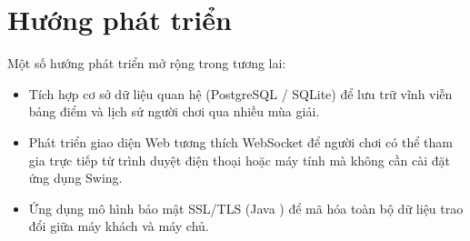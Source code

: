 \section{Hướng phát triển}

Một số hướng phát triển mở rộng trong tương lai:
\begin{itemize}[leftmargin=1.6em, itemsep=2pt]
  \item Tích hợp cơ sở dữ liệu quan hệ (PostgreSQL / SQLite) để lưu trữ vĩnh
        viễn bảng điểm và lịch sử người chơi qua nhiều mùa giải.
  \item Phát triển giao diện Web tương thích WebSocket để người chơi có thể
        tham gia trực tiếp từ trình duyệt điện thoại hoặc máy tính mà không
        cần cài đặt ứng dụng Swing.
  \item Ứng dụng mô hình bảo mật SSL/TLS (Java ) để mã hóa
        toàn bộ dữ liệu trao đổi giữa máy khách và máy chủ.
\end{itemize}
